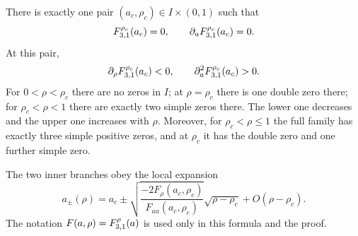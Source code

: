 \begin{theorem}\label{lerchbd:thm:fold}
There is exactly one pair $(a_c,\rho_c)\in I\times(0,1)$ such that
\[
 F_{3,1}^{\rho_c}(a_c)=0,\qquad \partial_aF_{3,1}^{\rho_c}(a_c)=0.
\]
At this pair,
\begin{equation}\label{lerchbd:eq:fold-signs}
 \partial_\rho F_{3,1}^{\rho_c}(a_c)<0,
 \qquad \partial_a^2F_{3,1}^{\rho_c}(a_c)>0.
\end{equation}
For $0<\rho<\rho_c$ there are no zeros in $I$; at $\rho=\rho_c$ there is one double zero there; for $\rho_c<\rho<1$ there are exactly two simple zeros there. The lower one decreases and the upper one increases with $\rho$. Moreover, for $\rho_c<\rho\le1$ the full family has exactly three simple positive zeros, and at $\rho_c$ it has the double zero and one further simple zero.

The two inner branches obey the local expansion
\begin{equation}\label{lerchbd:eq:fold-sqrt}
 a_\pm(\rho)=a_c\pm
 \sqrt{\frac{-2F_\rho(a_c,\rho_c)}{F_{aa}(a_c,\rho_c)}}
 \sqrt{\rho-\rho_c}+O(\rho-\rho_c).
\end{equation}
The notation $F(a,\rho)=F_{3,1}^{\rho}(a)$ is used only in this formula and the proof.
\end{theorem}
